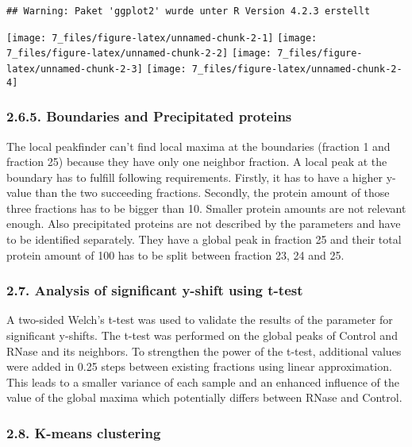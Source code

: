 \documentclass[
  12pt,
]{article}
\begin{document}
\begin{verbatim}
## Warning: Paket 'ggplot2' wurde unter R Version 4.2.3 erstellt
\end{verbatim}

\texttt{[image: 7\_files/figure-latex/unnamed-chunk-2-1]}
\texttt{[image: 7\_files/figure-latex/unnamed-chunk-2-2]}
\texttt{[image: 7\_files/figure-latex/unnamed-chunk-2-3]}
\texttt{[image: 7\_files/figure-latex/unnamed-chunk-2-4]}

\hypertarget{boundaries-and-precipitated-proteins}{%
\subsubsection{2.6.5. Boundaries and Precipitated
proteins}\label{boundaries-and-precipitated-proteins}}

The local peakfinder can't find local maxima at the boundaries (fraction
1 and fraction 25) because they have only one neighbor fraction. A local
peak at the boundary has to fulfill following requirements. Firstly, it
has to have a higher y-value than the two succeeding fractions.
Secondly, the protein amount of those three fractions has to be bigger
than 10. Smaller protein amounts are not relevant enough. Also
precipitated proteins are not described by the parameters and have to be
identified separately. They have a global peak in fraction 25 and their
total protein amount of 100 has to be split between fraction 23, 24 and
25.

\hypertarget{analysis-of-significant-y-shift-using-t-test}{%
\subsubsection{2.7. Analysis of significant y-shift using
t-test}\label{analysis-of-significant-y-shift-using-t-test}}

A two-sided Welch's t-test was used to validate the results of the
parameter for significant y-shifts. The t-test was performed on the
global peaks of Control and RNase and its neighbors. To strengthen the
power of the t-test, additional values were added in 0.25 steps between
existing fractions using linear approximation. This leads to a smaller
variance of each sample and an enhanced influence of the value of the
global maxima which potentially differs between RNase and Control.

\hypertarget{k-means-clustering}{%
\subsubsection{2.8. K-means clustering}\label{k-means-clustering}}
\end{document}
